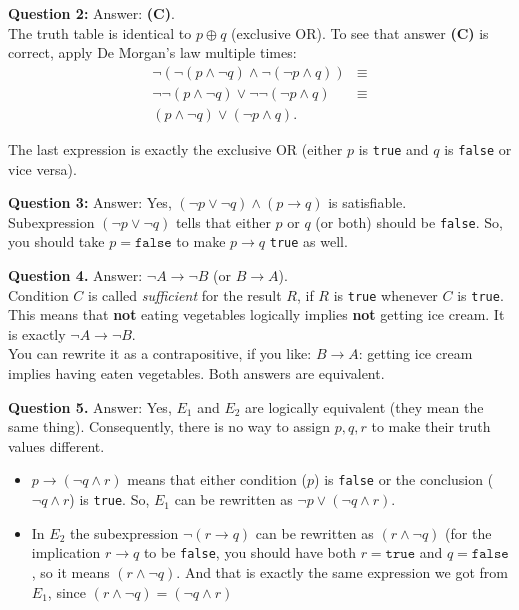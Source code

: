 \documentclass[jou]{apa6}
\begin{document}
\vspace{10pt}
{\bf Question 2:} Answer: {\bf (C)}.\\
The truth table is identical to $p \oplus q$ (exclusive OR). 
To see that answer {\bf (C)} is correct, apply De Morgan's law multiple times:
\begin{align}
\neg (\neg ( p \wedge \neg q) \wedge \neg (\neg p \wedge q)) & \equiv \nonumber \\
\neg \neg (p \wedge \neg q) \vee \neg \neg (\neg p \wedge q) & \equiv \nonumber \\
(p \wedge \neg q) \vee (\neg p \wedge q). & \nonumber
\end{align}

The last expression is exactly the exclusive OR (either $p$ is {\tt true} and
$q$ is {\tt false} or vice versa).

\vspace{10pt}
{\bf Question 3:} Answer: Yes,
$(\neg p \vee \neg q) \wedge (p \rightarrow q)$ is 
satisfiable.\\
Subexpression $(\neg p \vee \neg q)$ tells that either $p$ 
or $q$ (or both) should be {\tt false}. So, you should take
$p = \mathtt{false}$ to make $p \rightarrow q$ {\tt true} as well. 


\vspace{10pt}
{\bf Question 4.} Answer: $\neg A \rightarrow \neg B$ (or $B \rightarrow A$).\\
Condition $C$ is called {\em sufficient} for the result $R$, if 
$R$ is {\tt true} whenever $C$ is {\tt true}. 
This means that {\bf not} eating vegetables logically implies {\bf not} 
getting ice cream. It is exactly $\neg A \rightarrow \neg B$.\\
You can rewrite it as a contrapositive, if you like: $B \rightarrow A$:
getting ice cream implies having eaten vegetables. Both answers are
equivalent.

\vspace{10pt}
{\bf Question 5.} Answer: Yes, $E_1$ and $E_2$ are logically equivalent 
(they mean the same thing).
Consequently, there is no way to assign $p,q,r$ to make their truth values different.

\begin{itemize}
\item $p \rightarrow (\neg q \wedge r)$ means that either condition ($p$) is {\tt false} or 
the conclusion ($\neg q \wedge r$) is {\tt true}. So, $E_1$ can be rewritten as 
$\neg p \vee (\neg q \wedge r)$.
\item In $E_2$ the subexpression 
$\neg(r \rightarrow q)$ can be rewritten as $(r \wedge \neg q)$
(for the implication $r \rightarrow q$ to be {\tt false}, you should have
both $r = \mathtt{true}$ and $q = \mathtt{false}$, so it 
means $(r \wedge \neg q)$. And that is exactly the same expression we got 
from $E_1$, since $(r \wedge \neg q) = (\neg q \wedge r)$
\end{itemize}
\end{document}
